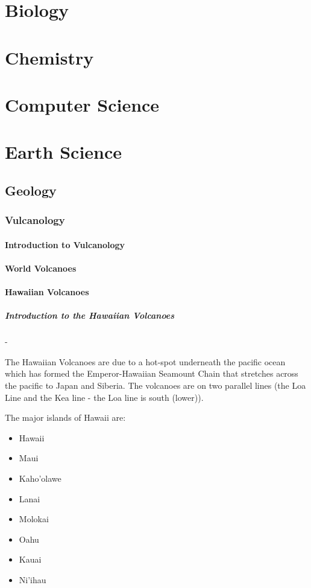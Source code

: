 \documentclass[12pt]{book}
\begin{document}
	\section{Biology}
	\section{Chemistry}
	\section{Computer Science}
	\newpage
	\section{Earth Science}
		\subsection{Geology}
			\subsubsection{Vulcanology}
			\paragraph{Introduction to Vulcanology}
			\paragraph{World Volcanoes}
			\newpage
			\paragraph{Hawaiian Volcanoes}
				\subparagraph{Introduction to the Hawaiian Volcanoes} - 
				
				The Hawaiian Volcanoes are due to a hot-spot underneath the pacific ocean which has formed the Emperor-Hawaiian Seamount Chain that stretches across the pacific to Japan and Siberia.  The volcanoes are on two parallel lines (the Loa Line and the Kea line - the Loa line is south (lower)).   
				
				The major islands of Hawaii are: 
				\begin{itemize}
					\item Hawaii
					\item Maui
					\item Kaho'olawe
					\item Lanai
					\item Molokai
					\item Oahu
					\item Kauai
					\item Ni'ihau
				\end{itemize}
\end{document}

